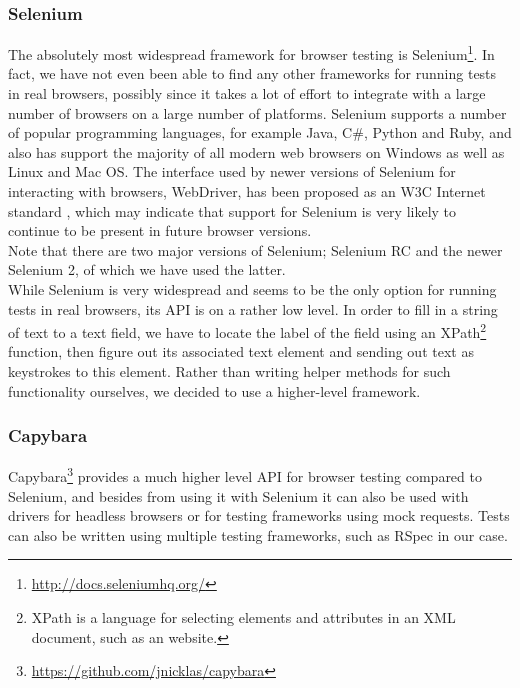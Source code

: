 \label{sec:choices_browser}

\subsubsection{Selenium}

The absolutely most widespread framework for browser testing is
Selenium\footnote{\url{http://docs.seleniumhq.org/}}. In fact, we have
not even been able to find any other frameworks for running tests in
real browsers, possibly since it takes a lot of effort to integrate with
a large number of browsers on a large number of platforms. Selenium
supports a number of popular programming languages, for example Java,
C\#, Python and Ruby, and also has support the majority of all modern
web browsers on Windows as well as Linux and Mac OS. The interface used
by newer versions of Selenium for interacting with browsers, WebDriver,
has been proposed as an W3C Internet standard \cite{web:webdriver},
which may indicate that support for Selenium is very likely to continue
to be present in future browser versions. \cite{wiki:selenium}\\

Note that there are two major versions of Selenium; Selenium RC
and the newer Selenium 2, of which we have used the latter.\\

While Selenium is very widespread and seems to be the only option for
running tests in real browsers, its API is on a rather low level. In
order to fill in a string of text to a text field, we have to locate the
label of the field using an XPath\footnote{XPath is a language for
selecting elements and attributes in an XML document, such as an
website.} function, then figure out its associated text element and
sending out text as keystrokes to this element. Rather than writing
helper methods for such functionality ourselves, we decided to use
a higher-level framework.\\

\subsubsection{Capybara}
Capybara\footnote{\url{https://github.com/jnicklas/capybara}} provides a
much higher level API for browser testing compared to Selenium, and
besides from using it with Selenium it can also be used with drivers for
headless browsers or for testing frameworks using mock requests. Tests
can also be written using multiple testing frameworks, such as RSpec
in our case.\\

